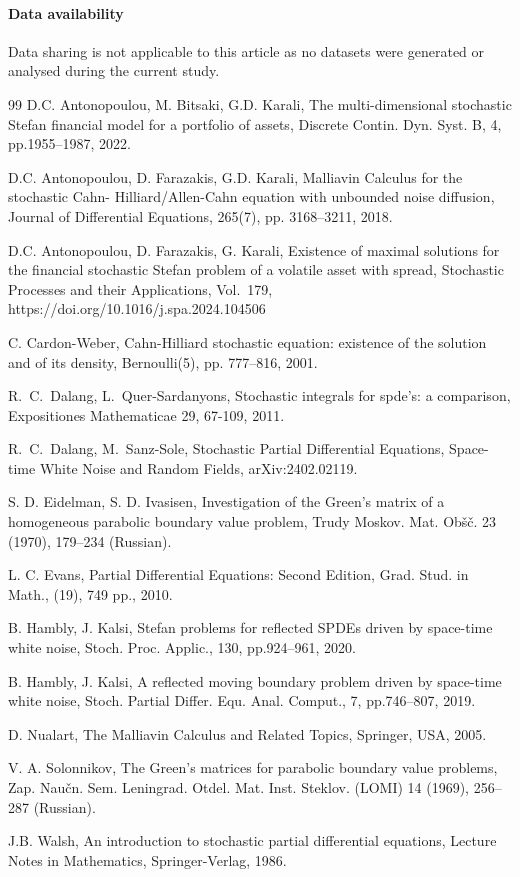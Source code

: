 \documentclass[reqno]{amsart}
\numberwithin{equation}{section}
\begin{document}
\vspace{0.5cm}

\paragraph*{\bfseries Data availability} Data sharing is not applicable to this article as no datasets were generated or analysed during the current study.




\begin{thebibliography}{99}
 D.C. Antonopoulou, M. Bitsaki, G.D. Karali, The multi-dimensional
stochastic Stefan financial model for a portfolio of assets, Discrete Contin. Dyn. Syst. B, 4, pp.1955--1987, 2022.


 D.C. Antonopoulou, D. Farazakis, G.D. Karali, Malliavin Calculus
for the stochastic Cahn- Hilliard/Allen-Cahn equation with unbounded noise diffusion, Journal of Differential Equations, 265(7), pp. 3168--3211, 2018.

 D.C. Antonopoulou, D. Farazakis, G. Karali, Existence of maximal solutions for the financial stochastic Stefan problem of a volatile asset with spread, Stochastic Processes and their Applications, Vol.\ 179, https://doi.org/10.1016/j.spa.2024.104506

 C. Cardon-Weber, Cahn-Hilliard stochastic equation: existence of the solution and of its density, Bernoulli(5), pp. 777--816, 2001.

 R.\ C.\ Dalang, L.\ Quer-Sardanyons, Stochastic integrals for spde's: a comparison, Expositiones Mathematicae 29, 67-109, 2011.

 R.\ C.\ Dalang, M.\ Sanz-Sole, Stochastic Partial Differential Equations, Space-time White Noise and Random Fields, arXiv:2402.02119.

 S. D. Eidelman, S. D. Ivasisen, Investigation of the Green's matrix of a homogeneous parabolic boundary value problem, Trudy Moskov. Mat. Ob\v s\v c. 23 (1970), 179--234 (Russian).

 L. C. Evans, Partial Differential Equations: Second Edition, Grad. Stud. in Math., (19), 749 pp., 2010.

 B. Hambly, J. Kalsi, Stefan problems for reflected SPDEs driven by space-time white noise, Stoch. Proc. Applic., 130, pp.924--961,
2020.

 B. Hambly, J. Kalsi, A reflected moving boundary problem driven by space-time white noise, Stoch. Partial Differ. Equ. Anal. Comput., 7, pp.746--807, 2019.

 D. Nualart, The Malliavin Calculus and Related Topics, Springer, USA, 2005.

 V. A. Solonnikov, The Green's matrices for parabolic boundary value problems, Zap. Nau\v cn. Sem. Leningrad. Otdel. Mat. Inst. Steklov. (LOMI) 14 (1969), 256--287 (Russian).

 J.B. Walsh, An introduction to stochastic partial differential
equations, Lecture Notes in Mathematics, Springer-Verlag, 1986.
\end{thebibliography}
\end{document}
